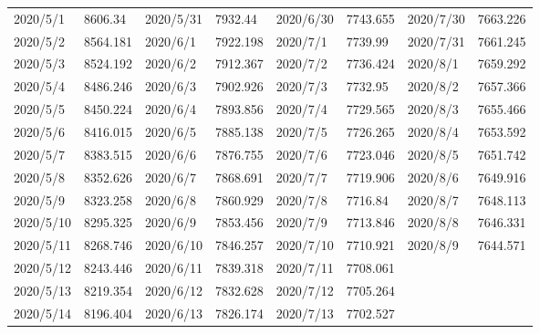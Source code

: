 \documentclass[a4paper, 11pt,twoside=true,UTF8]{scrartcl}
\begin{document}
\begin{table}[H]
\begin{tabular}{llllllll}
		2020/5/1  & 8606.34  & 2020/5/31 & 7932.44  & 2020/6/30 & 7743.655 & 2020/7/30 & 7663.226 \\
		2020/5/2  & 8564.181 & 2020/6/1  & 7922.198 & 2020/7/1  & 7739.99  & 2020/7/31 & 7661.245 \\
		2020/5/3  & 8524.192 & 2020/6/2  & 7912.367 & 2020/7/2  & 7736.424 & 2020/8/1  & 7659.292 \\
		2020/5/4  & 8486.246 & 2020/6/3  & 7902.926 & 2020/7/3  & 7732.95  & 2020/8/2  & 7657.366 \\
		2020/5/5  & 8450.224 & 2020/6/4  & 7893.856 & 2020/7/4  & 7729.565 & 2020/8/3  & 7655.466 \\
		2020/5/6  & 8416.015 & 2020/6/5  & 7885.138 & 2020/7/5  & 7726.265 & 2020/8/4  & 7653.592 \\
		2020/5/7  & 8383.515 & 2020/6/6  & 7876.755 & 2020/7/6  & 7723.046 & 2020/8/5  & 7651.742 \\
		2020/5/8  & 8352.626 & 2020/6/7  & 7868.691 & 2020/7/7  & 7719.906 & 2020/8/6  & 7649.916 \\
		2020/5/9  & 8323.258 & 2020/6/8  & 7860.929 & 2020/7/8  & 7716.84  & 2020/8/7  & 7648.113 \\
		2020/5/10 & 8295.325 & 2020/6/9  & 7853.456 & 2020/7/9  & 7713.846 & 2020/8/8  & 7646.331 \\
		2020/5/11 & 8268.746 & 2020/6/10 & 7846.257 & 2020/7/10 & 7710.921 & 2020/8/9  & 7644.571 \\
		2020/5/12 & 8243.446 & 2020/6/11 & 7839.318 & 2020/7/11 & 7708.061 &           &          \\
		2020/5/13 & 8219.354 & 2020/6/12 & 7832.628 & 2020/7/12 & 7705.264 &           &          \\
		2020/5/14 & 8196.404 & 2020/6/13 & 7826.174 & 2020/7/13 & 7702.527 &           &          \\ \hline
	\end{tabular}
\end{table}

\newpage
\end{document}
